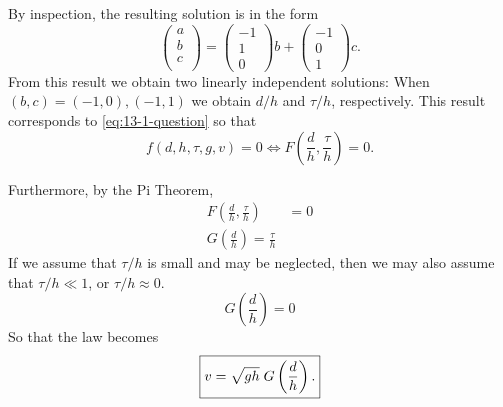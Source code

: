 \documentclass[12pt]{article}
\begin{document}
\begin{enumerate}
\begin{equation*}
    \end{equation*}
    By inspection, the resulting solution is in the form
    \begin{equation*}
      \begin{pmatrix}
        a \\ b \\ c \\
      \end{pmatrix} =
      \begin{pmatrix}
        -1 \\ 1 \\ 0
      \end{pmatrix}b +
      \begin{pmatrix}
        -1 \\ 0 \\ 1
      \end{pmatrix}c.
    \end{equation*}
    From this result we obtain two linearly independent solutions: When
    $(b,c)=(-1,0),(-1,1)$ we obtain $d/h$ and $\tau/h$, respectively. This result
    corresponds to \cref{eq:13-1-question} so that
    \begin{equation*}
      f(d,h,\tau,g,v) = 0 \Longleftrightarrow F\left(\frac{d}{h},\frac{\tau}{h}\right) = 0.
    \end{equation*}

    Furthermore, by the Pi Theorem,
    \begin{equation*}
      \begin{aligned}
        F\left(\frac{d}{h},\frac{\tau}{h}\right) &= 0 \\
        G\left(\frac{d}{h}\right) = \frac{\tau}{h}
      \end{aligned}
    \end{equation*}
    If we assume that $\tau/h$ is small and may be neglected, then we may also
    assume that $\tau/h \ll 1$, or $\tau/h \approx 0$.
    \begin{equation*}
      G\left(\frac{d}{h}\right) = 0
    \end{equation*}
    So that the law becomes
    \begin{equation} \boxed{
        \label{eq:13-1-new-law}
        v=\sqrt{gh}\; G\left(\frac{d}{h}\right).
      }
    \end{equation}


\end{enumerate}
\end{document}
